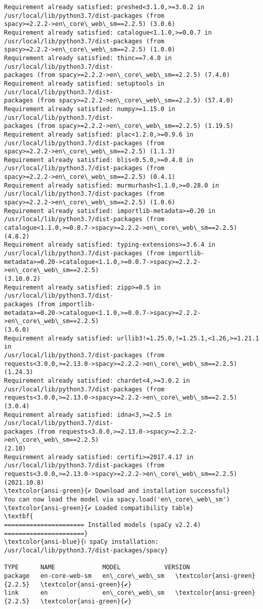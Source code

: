 \documentclass[11pt]{article}
\begin{document}
\begin{Verbatim}[commandchars=\\\{\}]
Requirement already satisfied: preshed<3.1.0,>=3.0.2 in
/usr/local/lib/python3.7/dist-packages (from
spacy>=2.2.2->en\_core\_web\_sm==2.2.5) (3.0.6)
Requirement already satisfied: catalogue<1.1.0,>=0.0.7 in
/usr/local/lib/python3.7/dist-packages (from
spacy>=2.2.2->en\_core\_web\_sm==2.2.5) (1.0.0)
Requirement already satisfied: thinc==7.4.0 in /usr/local/lib/python3.7/dist-
packages (from spacy>=2.2.2->en\_core\_web\_sm==2.2.5) (7.4.0)
Requirement already satisfied: setuptools in /usr/local/lib/python3.7/dist-
packages (from spacy>=2.2.2->en\_core\_web\_sm==2.2.5) (57.4.0)
Requirement already satisfied: numpy>=1.15.0 in /usr/local/lib/python3.7/dist-
packages (from spacy>=2.2.2->en\_core\_web\_sm==2.2.5) (1.19.5)
Requirement already satisfied: plac<1.2.0,>=0.9.6 in
/usr/local/lib/python3.7/dist-packages (from
spacy>=2.2.2->en\_core\_web\_sm==2.2.5) (1.1.3)
Requirement already satisfied: blis<0.5.0,>=0.4.0 in
/usr/local/lib/python3.7/dist-packages (from
spacy>=2.2.2->en\_core\_web\_sm==2.2.5) (0.4.1)
Requirement already satisfied: murmurhash<1.1.0,>=0.28.0 in
/usr/local/lib/python3.7/dist-packages (from
spacy>=2.2.2->en\_core\_web\_sm==2.2.5) (1.0.6)
Requirement already satisfied: importlib-metadata>=0.20 in
/usr/local/lib/python3.7/dist-packages (from
catalogue<1.1.0,>=0.0.7->spacy>=2.2.2->en\_core\_web\_sm==2.2.5) (4.8.2)
Requirement already satisfied: typing-extensions>=3.6.4 in
/usr/local/lib/python3.7/dist-packages (from importlib-
metadata>=0.20->catalogue<1.1.0,>=0.0.7->spacy>=2.2.2->en\_core\_web\_sm==2.2.5)
(3.10.0.2)
Requirement already satisfied: zipp>=0.5 in /usr/local/lib/python3.7/dist-
packages (from importlib-
metadata>=0.20->catalogue<1.1.0,>=0.0.7->spacy>=2.2.2->en\_core\_web\_sm==2.2.5)
(3.6.0)
Requirement already satisfied: urllib3!=1.25.0,!=1.25.1,<1.26,>=1.21.1 in
/usr/local/lib/python3.7/dist-packages (from
requests<3.0.0,>=2.13.0->spacy>=2.2.2->en\_core\_web\_sm==2.2.5) (1.24.3)
Requirement already satisfied: chardet<4,>=3.0.2 in
/usr/local/lib/python3.7/dist-packages (from
requests<3.0.0,>=2.13.0->spacy>=2.2.2->en\_core\_web\_sm==2.2.5) (3.0.4)
Requirement already satisfied: idna<3,>=2.5 in /usr/local/lib/python3.7/dist-
packages (from requests<3.0.0,>=2.13.0->spacy>=2.2.2->en\_core\_web\_sm==2.2.5)
(2.10)
Requirement already satisfied: certifi>=2017.4.17 in
/usr/local/lib/python3.7/dist-packages (from
requests<3.0.0,>=2.13.0->spacy>=2.2.2->en\_core\_web\_sm==2.2.5) (2021.10.8)
\textcolor{ansi-green}{✔ Download and installation successful}
You can now load the model via spacy.load('en\_core\_web\_sm')
\textcolor{ansi-green}{✔ Loaded compatibility table}
\textbf{
====================== Installed models (spaCy v2.2.4)
======================}
\textcolor{ansi-blue}{ℹ spaCy installation: /usr/local/lib/python3.7/dist-packages/spacy}

TYPE      NAME             MODEL            VERSION
package   en-core-web-sm   en\_core\_web\_sm   \textcolor{ansi-green}{2.2.5}   \textcolor{ansi-green}{✔}
link      en               en\_core\_web\_sm   \textcolor{ansi-green}{2.2.5}   \textcolor{ansi-green}{✔}

    \end{Verbatim}
\end{document}

